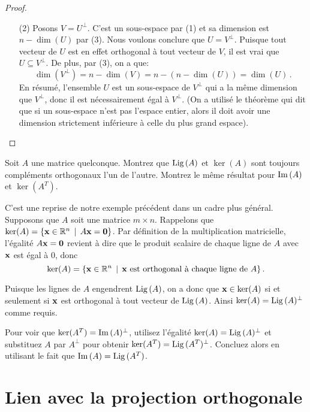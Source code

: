 \begin{proof}
\begin{enumerate}[(1)]
	\item[(2)] Posons $V = U^\perp$. C'est un sous-espace par (1)
et sa dimension est $n - \dim(U)$ par (3).   Nous voulons conclure que $U = V^\perp$.  Puisque tout vecteur de $U$ est en effet orthogonal à tout vecteur de $V$, il est vrai que $U \subseteq V^\perp$.  De plus, par (3), on a que:
$$\dim(V^\perp) = n- \dim(V) = n-(n-\dim(U)) = \dim(U)\,.$$  
En résumé, l'ensemble $U$ est un sous-espace de $V^\perp$ 
qui a la même dimension que $V^\perp$, donc il est nécessairement \'egal \`a $V^\perp$.
(On a utilisé le théorème qui dit que si un sous-espace n'est pas l'espace entier, alors il
doit avoir une dimension strictement inf\'erieure \`a celle du plus grand espace).
\end{enumerate}
\end{proof}

\begin{myprob}
Soit $A$ une matrice quelconque.  Montrez que $\operatorname{Lig\,}(A)$ et $\ker(A)$ sont toujours compléments orthogonaux l'un de l'autre. Montrez le même résultat pour $\operatorname{Im}\,(A)$ et $\ker(A^T)$.  

\begin{mysol}

C'est une reprise de notre exemple pr\'ec\'edent dans un cadre plus général.
Supposons que $A$ soit une matrice $m \times n$.
Rappelons que $\ker(A)=\{\mathbf{x} \in \mathbb{R}^n\, \mid \, A \mathbf{x}=\mathbf{0}\}$.
Par définition de la multiplication matricielle, l'égalité $A\mathbf{x}=\mathbf{0}$ revient à
dire que le produit scalaire de chaque ligne de $A$ avec $\mathbf{x}$ est égal à 0, donc $$\ker(A)=\{\mathbf{x} \in \mathbb{R}^n \, \mid \, \mathbf{x} \text{ est orthogonal à chaque ligne de } A\}\,.$$ 

Puisque les lignes de $A$ engendrent $\operatorname{Lig\,}(A)$, on a donc que $\mathbf{x} \in \ker(A)$ si et seulement si $\mathbf{x}$ est orthogonal à tout vecteur de $\operatorname{Lig\,}(A)$. Ainsi $\ker(A)=\operatorname{Lig\,}(A)^\perp$ comme requis.

Pour voir que $\ker(A^T)=\operatorname{Im}\,(A)^\perp$, utilisez l'égalité $\ker(A)=\operatorname{Lig\,}(A)^\perp$ et substituez $A$ par $A^\perp$ pour obtenir $\ker(A^T)=\operatorname{Lig\,}(A^T)^\perp$. Concluez alors en utilisant le fait que $\operatorname{Im}\,(A)=\operatorname{Lig\,}(A^T)$.
\end{mysol}
\end{myprob}






\section{Lien avec la projection orthogonale}

